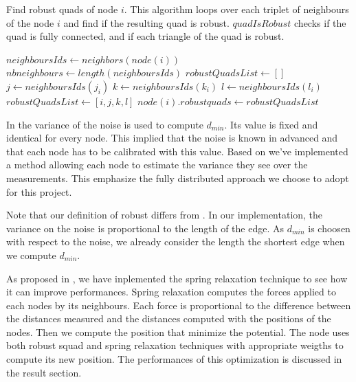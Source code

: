 \documentclass[letterpaper, 10 pt, conference]{ieeeconf}  %
\begin{document}
\begin{algorithm}[H]
\caption{Find robust quads of node $i$. This algorithm loops over each triplet of neighbours of the node $i$ and find if the resulting quad is robust. $quadIsRobust$ checks if the quad is fully connected, and if each triangle of the quad is robust.}
\begin{algorithmic} 
\STATE $neighboursIds \leftarrow neighbors(node(i))$
\STATE $nbneighbours \leftarrow length(neighboursIds)$ 
\STATE $robustQuadsList \leftarrow []$ 
\STATE $j \leftarrow neighboursIds(j_i)$ 
\STATE $k \leftarrow neighboursIds(k_i)$
\STATE $l \leftarrow neighboursIds(l_i)$ \newline
{} 
\STATE $robustQuadsList \leftarrow [i, j, k, l]$
\ENDIF 
\newline
\ENDFOR
\ENDFOR
\ENDFOR 
\STATE $node(i).robustquads \leftarrow robustQuadsList$
\end{algorithmic}
\end{algorithm}

In \cite{} the variance of the noise is used to compute $d_{min}$. Its value is fixed and identical for every node. This implied that the noise is known in advanced and that each node has to be calibrated with this value. Based on \cite{Knuth} we've implemented a method allowing each node to estimate the variance they see over the measurements. This emphasize the fully distributed approach we choose to adopt for this project.\newline

Note that our definition of robust differs from \cite{}. In our implementation, the variance on the noise is proportional to the length of the edge. As $d_{min}$ is choosen with respect to the noise, we already consider the length the shortest edge when we compute $d_{min}$. \newline

As proposed in \cite{}, we have inplemented the spring relaxation technique to see how it can improve performances. Spring relaxation computes the forces applied to each nodes by its neighbours. Each force is proportional to the difference between the distances measured and the distances computed with the positions of the nodes. Then we compute the position that minimize the potential.
The node uses both robust squad and spring relaxation techniques with appropriate weigths to compute its new position. The performances of this optimization is discussed in the result section. 
\newline
\end{document}
